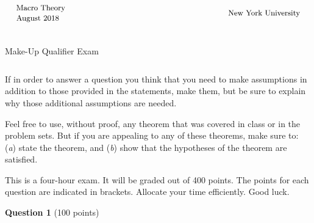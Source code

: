 \documentclass[11pt]{article}
\begin{document}
\thispagestyle{empty}\newpage

\begin{equation*}
\begin{tabular}{cccccccccccccccl}
\begin{tabular}{l}
{\small Macro Theory} \\
{\small August 2018}%
\end{tabular}
&  &  &  &  &  &  &  &  &  &  &  &  &  &  &
\begin{tabular}{l}
{\small New York University} \\
\end{tabular}%
\end{tabular}%
\end{equation*}%
\begin{eqnarray*}
&& \\
&&
\end{eqnarray*}

\begin{center}
{\large Make-Up Qualifier Exam}
\end{center}

\begin{eqnarray*}
&& \\
&&
\end{eqnarray*}%
\noindent If in order to answer a question you think that you need to make
assumptions in addition to those provided in the statements, make them, but
be sure to explain why those additional assumptions are needed.

\bigskip

\noindent Feel free to use, without proof, any theorem that was covered in
class or in the problem sets. But if you are appealing to any of these
theorems, make sure to: (\textit{a}) state the theorem, and (\textit{b})
show that the hypotheses of the theorem are satisfied.



\bigskip

\noindent This is a four-hour exam. It will be graded out of 400 points. The
points for each question are indicated in brackets. Allocate your time
efficiently. Good luck.

\newpage


\noindent \textbf{Question 1} (100 points)\medskip
\end{document}
